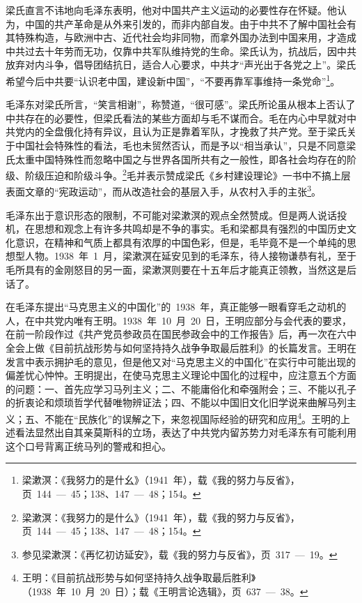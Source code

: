 梁氏直言不讳地向毛泽东表明，他对中国共产主义运动的必要性存在怀疑。他认为，中国的共产革命是从外来引发的，而非内部自发。由于中共不了解中国社会有其特殊构造，与欧洲中古、近代社会均非同物，而拿外国办法到中国来用，才造成中共过去十年劳而无功，仅靠中共军队维持党的生命。梁氏认为，抗战后，因中共放弃对内斗争，倡导团结抗日，适合人心要求，中共才“声光出于各党之上”。梁氏希望今后中共要“认识老中国，建设新中国”，“不要再靠军事维持一条党命”\footnote{梁漱溟：《我努力的是什幺》（1941~年），载《我的努力与反省》，页~144~—~45；138、147~—~48；154。}。

毛泽东对梁氏所言，“笑言相谢”，称赞道，“很可感”。梁氏所论虽从根本上否认了中共存在的必要性，但梁氏看法的某些方面却与毛不谋而合。毛在内心中早就对中共党内的全盘俄化持有异议，且认为正是靠着军队，才挽救了共产党。至于梁氏关于中国社会特殊性的看法，毛也未贸然否认，而是予以“相当承认”，只是不同意梁氏太重中国特殊性而忽略中国之与世界各国所共有之一般性，即各社会均存在的阶级、阶级压迫和阶级斗争。\footnote{梁漱溟：《我努力的是什么》（1941~年），载《我的努力与反省》，页~144~—~45；138、147~—~48；154。}毛并表示赞成梁氏《乡村建设理论》一书中不搞上层表面文章的“宪政运动”，而从改造社会的基层入手，从农村入手的主张\footnote{参见梁漱溟：《再忆初访延安》，载《我的努力与反省》，页~317~—~19。}。

毛泽东出于意识形态的限制，不可能对梁漱溟的观点全然赞成。但是两人说话投机，在思想和观念上有许多共鸣却是不争的事实。毛和梁都具有强烈的中国历史文化意识，在精神和气质上都具有浓厚的中国色彩，但是，毛毕竟不是一个单纯的思想型人物。1938~年~1~月，梁漱溟在延安见到的毛泽东，待人接物谦恭有礼，至于毛所具有的金刚怒目的另一面，梁漱溟则要在十五年后才能真正领教，当然这是后话了。

在毛泽东提出“马克思主义的中国化”的~1938~年，真正能够一眼看穿毛之动机的人，在中共党内唯有王明。1938~年~10~月~20~日，王明应部分与会代表的要求，在前一阶段作过《共产党员参政员在国民参政会中的工作报告》后，再一次在六中全会上做《目前抗战形势与如何坚持持久战争争取最后胜利》的长篇发言。王明在发言中表示拥护毛的意见，但是他又对“马克思主义的中国化”在实行中可能出现的偏差忧心忡忡。王明提出，在使马克思主义理论中国化的过程中，应注意五个方面的问题：一、首先应学习马列主义；二、不能庸俗化和牵强附会；三、不能以孔子的折衷论和烦琐哲学代替唯物辨证法；四、不能以中国旧文化旧学说来曲解马列主义；五、不能在“民族化”的误解之下，来忽视国际经验的研究和应用\footnote{王明：《目前抗战形势与如何坚持持久战争取最后胜利》（1938~年~10~月~20~日）；载《王明言论选辑》，页~637~—~38。}。王明的上述看法显然出自其亲莫斯科的立场，表达了中共党内留苏势力对毛泽东有可能利用这个口号背离正统马列的警戒和担心。

